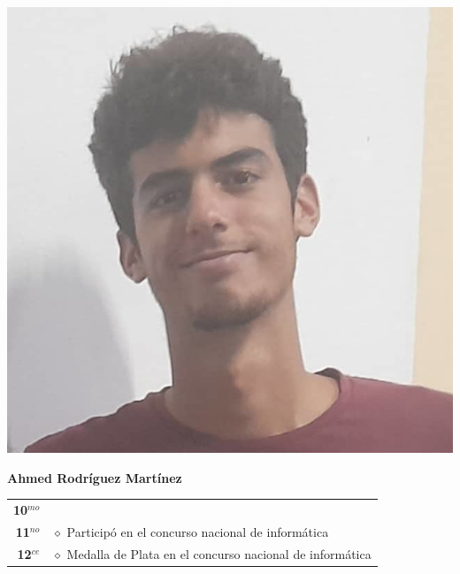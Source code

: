 \begin{minipage}{0.2\textwidth}
	\includegraphics[width=\linewidth]{img/concursantes/ahmed.png} %
\end{minipage}
\hfill
\begin{minipage}{0.7\textwidth}
	\textbf{Ahmed Rodríguez Martínez}
	
	\vspace*{0.1in}
	\begin{tabular}{rl}
		
		\textbf{10$^{mo}$} &   \\
		
		\textbf{11$^{no}$} & $\diamond$ Participó en el concurso nacional de informática \\
		
		\textbf{12$^{ce}$} & $\diamond$ Medalla de Plata en el concurso nacional de informática \\
		
		
	\end{tabular}
\end{minipage}

